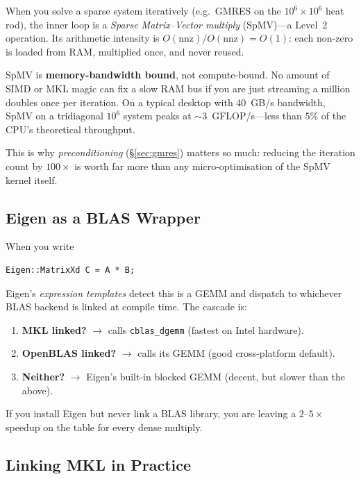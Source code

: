 When you solve a sparse system iteratively (e.g.\ GMRES on the
$10^6 \times 10^6$ heat rod), the inner loop is a \emph{Sparse
Matrix--Vector multiply} (SpMV)---a Level~2 operation.  Its arithmetic
intensity is $O(\text{nnz})/O(\text{nnz}) = O(1)$: each non-zero is
loaded from RAM, multiplied once, and never reused.

\begin{warningbox}
SpMV is \textbf{memory-bandwidth bound}, not compute-bound.
No amount of SIMD or MKL magic can fix a slow RAM bus if you are
just streaming a million doubles once per iteration.  On a typical
desktop with 40~GB/s bandwidth, SpMV on a tridiagonal $10^6$ system
peaks at $\sim\!3$~GFLOP/s---less than $5\%$ of the CPU's
theoretical throughput.
\end{warningbox}

This is why \emph{preconditioning} (\S\ref{sec:gmres}) matters so much:
reducing the iteration count by $100\times$ is worth far more than any
micro-optimisation of the SpMV kernel itself.

\subsection{Eigen as a BLAS Wrapper}

When you write
\begin{lstlisting}
Eigen::MatrixXd C = A * B;
\end{lstlisting}
Eigen's \emph{expression templates} detect this is a GEMM and dispatch to
whichever BLAS backend is linked at compile time.  The cascade is:

\begin{enumerate}[nosep]
    \item \textbf{MKL linked?} $\rightarrow$ calls \texttt{cblas\_dgemm}
          (fastest on Intel hardware).
    \item \textbf{OpenBLAS linked?} $\rightarrow$ calls its GEMM
          (good cross-platform default).
    \item \textbf{Neither?} $\rightarrow$ Eigen's built-in blocked GEMM
          (decent, but slower than the above).
\end{enumerate}

\begin{warningbox}
If you install Eigen but never link a BLAS library, you are leaving
a $2$--$5\times$ speedup on the table for every dense multiply.
\end{warningbox}

\subsection{Linking MKL in Practice}

